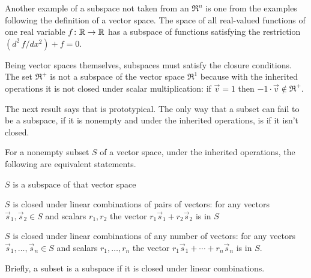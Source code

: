 \begin{example}
Another example of a subspace not taken from an $\Re^n$ is 
one from the examples following the definition of a vector space.
The space of all real-valued functions of one real variable 
$\mbox{$f\colon \mathbb{R}\to \mathbb{R}$}$ has a subspace of functions satisfying
the restriction $(d^2\,f/dx^2)+f=0$.
\end{example}

\begin{example}  \label{cex:RPlusNotSubSp}
Being vector spaces themselves, subspaces must satisfy the closure
conditions.
The set \( \Re^+ \) is not a subspace of the vector space \( \Re^1 \)
because with the inherited operations it is not closed under scalar
multiplication: if \( \vec{v}=1 \) then \( -1\cdot\vec{v}\not\in\Re^+ \).
\end{example}

The next result says that  is prototypical. 
The only way that a subset can fail to be a subspace, 
if it is nonempty and under the inherited operations,
is if it isn't closed.

\begin{lemma}     \label{th:SubspIffClosed} 
For a nonempty subset \( S \) of a vector space, under the inherited 
operations, the following are equivalent 
statements.   %
\begin{tfae}
  \item \( S \) is a subspace of that vector space
  \item \( S \) is closed under linear combinations of pairs of vectors:
    for any vectors \( \vec{s}_1,\vec{s}_2\in S \) and scalars \( r_1,r_2 \)
    the vector \( r_1\vec{s}_1+r_2\vec{s}_2 \) is in \( S \)
  \item \( S \) is closed under linear combinations of any number of vectors:
    for any vectors \( \vec{s}_1,\ldots,\vec{s}_n\in S \) and scalars
    \( r_1, \ldots,r_n \)
    the vector \( r_1\vec{s}_1+\cdots+r_n\vec{s}_n \) is in \( S \).
\end{tfae}
\end{lemma}
Briefly, a subset is a 
subspace if it is closed under linear combinations.

